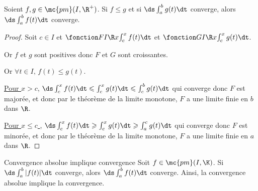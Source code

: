 \begin{proposition}{}{}
    Soient $f, g \in \mc{pm}(I, \R^+)$. Si $f \leqslant g$ et si
    $\ds \int_{a }^{b } g(t) \dt$ converge, alors $\ds \int_{a }^{b } f(t) \dt$ converge.
\end{proposition}


\begin{proof}
    Soit $c \in I$ et $\fonction F I \R x {\int_c^x f(t) \dt}$ et $\fonction G I \R x {\int_c^x g(t) \dt}$.

    Or $f$ et $g$ sont positives donc $F$ et $G$ sont croissantes.

    Or $\forall t \in I, \, f(t) \leqslant g(t)$. 

    \uline{Pour $x > c$}, $\ds \int_{c }^{x } f(t) \dt \leqslant \int_{c }^{x } g(t) \dt \leqslant \int_{c }^{b } g(t) \dt$ qui converge 
    donc $F$ est majorée, et donc par le théorème de la limite monotone, $F$ a une limite finie en $b$ dans $\R$.

    \avspace \uline{Pour $x \leqslant c$ }, $\ds \int_{c }^{x } f(t) \dt \geqslant \int_{c }^{x } g(t) \dt \geqslant \int_{a }^{c } g(t) \dt$ qui converge
    donc $F$ est minorée, et donc par le théorème de la limite monotone, $F$ a une limite finie en $a$ dans $\R$.
\end{proof}


\begin{theoreme}{Convergence absolue implique convergence}{}
    Soit $f \in \mc{pm}(I, \K)$. Si $\ds \int_{a }^{b } |f(t)| \dt$ converge, alors 
    $\ds \int_{a }^{b } f(t) \dt$ converge. Ainsi, la convergence absolue 
    implique la convergence.
\end{theoreme}


